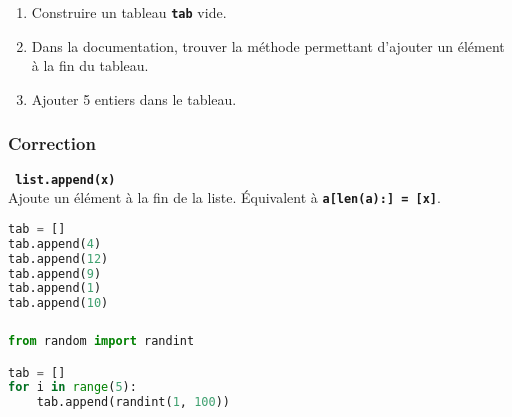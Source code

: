 \documentclass[svgnames,11pt]{beamer}
\begin{document}
\begin{frame}
    \frametitle{}

    \begin{activite}
    \begin{enumerate}
        \item Construire un tableau \textbf{\texttt{tab}} vide.
        \item Dans la documentation, trouver la méthode permettant d'ajouter un élément à la fin du tableau.
        \item Ajouter 5 entiers dans le tableau.
    \end{enumerate}
    \end{activite}

\end{frame}
\begin{frame}[fragile]
    \frametitle{Correction}
    \begin{framed}
        \texttt{\textbf{ list.append(x)}}\\
        Ajoute un élément à la fin de la liste. Équivalent à \texttt{\textbf{a[len(a):] = [x]}}.
    \end{framed}

\begin{lstlisting}[language=Python , basicstyle=\ttfamily\small, xleftmargin=2em, xrightmargin=2em]
tab = []
tab.append(4)
tab.append(12)
tab.append(9)
tab.append(1)
tab.append(10)
\end{lstlisting}

\end{frame}
\begin{frame}[fragile]
    \frametitle{}

    \begin{center}
\begin{lstlisting}[language=Python , basicstyle=\ttfamily\small, xleftmargin=2em, xrightmargin=2em]
from random import randint

tab = []
for i in range(5):
    tab.append(randint(1, 100))
\end{lstlisting}
\label{CODE}
\end{center}    

\end{frame}
\end{document}
